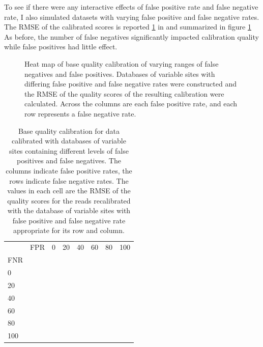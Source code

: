 \documentclass{article}
\begin{document}
\begin{outline}
	\item To see if there were any interactive effects of false positive rate and false negative rate, I also simulated datasets with varying false positive and false negative rates. The RMSE of the calibrated scores is reported \ref{table:fprfnr} in and summarized in figure \ref{figure:fprfnr} 
	As before, the number of false negatives significantly impacted calibration quality while false positives had little effect. %
\end{outline}

\begin{figure}
	\caption{Heat map of base quality calibration of varying ranges of false negatives and false positives. Databases of variable sites with differing false positive and false negative rates were constructed and the RMSE of the quality scores of the resulting calibration were calculated. Across the columns are each false positive rate, and each row represents a false negative rate.}
	\label{figure:fprfnr}
\end{figure}

\begin{table}
\begin{tabularx}{.5\textwidth}{| l l | X  X  X  X  X  X |}
\hline
& FPR& 0 & 20 & 40 & 60 & 80 & 100 \\
FNR &&   &    &    &    &    & \\ %
\hline
0   &&  &  &  &  &  & \\
20  &&  &  &  &  &  & \\
40  &&  &  &  &  &  & \\
60  &&  &  &  &  &  & \\
80  &&  &  &  &  &  & \\
100 &&  &  &  &  &  & \\
\hline
\end{tabularx}
\caption{Base quality calibration for data calibrated with databases of variable sites containing different levels of false positives and false negatives. The columns indicate false positive rates, the rows indicate false negative rates. The values in each cell are the RMSE of the quality scores for the reads recalibrated with the database of variable sites with false positive and false negative rate appropriate for its row and column.}
\label{table:fprfnr}
\end{table}
\end{document}
